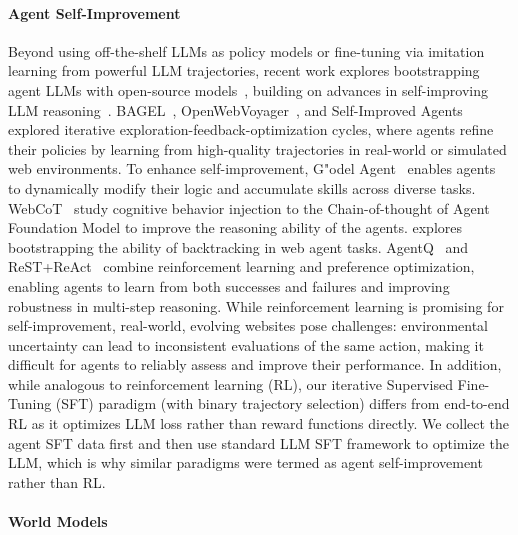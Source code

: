 \documentclass[11pt]{article}
\begin{document}
\paragraph{Agent Self-Improvement} Beyond using off-the-shelf LLMs as policy models or fine-tuning via imitation learning from powerful LLM trajectories, recent work explores bootstrapping agent LLMs with open-source models~\citep{rest_meets_react, LLM_agent_can_self_improve}, building on advances in self-improving LLM reasoning~\citep{self_instruct, STAR, B_STAR}.
BAGEL~\citep{BAGEL}, OpenWebVoyager~\citep{openwebvoyager}, and Self-Improved Agents~\citep{LLM_agent_can_self_improve} explored iterative exploration-feedback-optimization cycles, where agents refine their policies by learning from high-quality trajectories in real-world or simulated web environments. 
To enhance self-improvement, G"{o}del Agent~\citep{godal_agent} enables agents to dynamically modify their logic and accumulate skills across diverse tasks.
WebCoT~\cite{hu2025webcot} study cognitive behavior injection to the Chain-of-thought of Agent Foundation Model to improve the reasoning ability of the agents.
\cite{zhang2025enhancingwebagentsexplicit} explores bootstrapping the ability of backtracking in web agent tasks.
AgentQ~\citep{AgentQ} and ReST+ReAct~\citep{rest_meets_react} combine reinforcement learning and preference optimization, enabling agents to learn from both successes and failures and improving robustness in multi-step reasoning.
While reinforcement learning is promising for self-improvement, real-world, evolving websites pose challenges: environmental uncertainty can lead to inconsistent evaluations of the same action, making it difficult for agents to reliably assess and improve their performance.
In addition, while analogous to reinforcement learning (RL), our iterative Supervised Fine-Tuning (SFT) paradigm (with binary trajectory selection) differs from end-to-end RL as it optimizes LLM loss rather than reward functions directly. We collect the agent SFT data first and then use standard LLM SFT framework to optimize the LLM, which is why similar paradigms were termed as agent self-improvement rather than RL.



\paragraph{World Models} 
\end{document}
